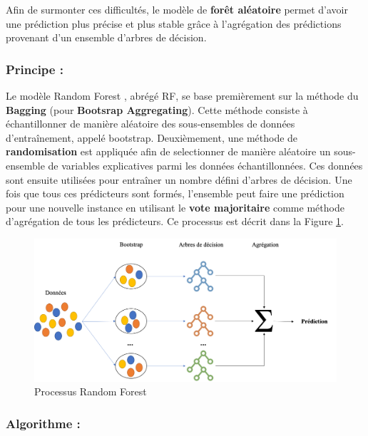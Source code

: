 \documentclass[11pt]{article}
\begin{document}
\begin{center}
Afin de surmonter ces difficultés, le modèle de \textbf{forêt aléatoire} permet d'avoir une prédiction plus précise et plus stable grâce à l’agrégation des prédictions provenant d'un ensemble d'arbres de décision.\par

\subsubsection{Principe :}

Le modèle Random Forest \cite{598994}\cite{breiman2001random}, abrégé RF, se base premièrement sur la méthode du \textbf{Bagging} (pour \textbf{Bootsrap Aggregating}). Cette méthode consiste à échantillonner de manière aléatoire des sous-ensembles de données d'entraînement, appelé bootstrap.
Deuxièmement, une méthode de \textbf{randomisation} est appliquée afin de selectionner de manière aléatoire un sous-ensemble de variables explicatives parmi les données échantillonnées. Ces données sont ensuite utilisées pour entraîner un nombre défini d'arbres de décision.
Une fois que tous ces prédicteurs sont formés, l'ensemble peut faire une prédiction pour une nouvelle instance en utilisant le \textbf{vote majoritaire} comme méthode d’agrégation de tous les prédicteurs. Ce processus est décrit dans la Figure \ref{RF}.\par

\begin{figure}[hbt!]
    \centering
    \includegraphics[width = 15 cm]{./figures/RF.png}
    \caption{Processus Random Forest}
    \label{RF}
\end{figure}
\FloatBarrier

\newpage

\subsubsection{Algorithme :}


\end{center}
\end{document}
